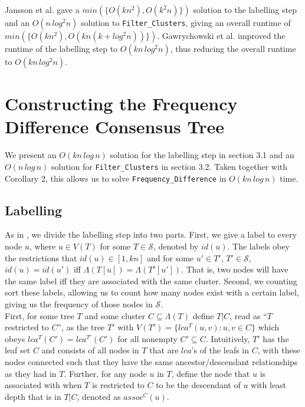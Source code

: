 \documentclass{article}
\newcommand{\leafset}{\Lambda}
\begin{document}
    Jansson et al. \cite{jansson2018algorithms} gave a $min(\{O(kn^2), O(k^2n)\})$ solution to the labelling step and an $O(n\,log^2n)$ solution to \texttt{Filter\_Clusters}, giving an overall runtime of $min(\{O(kn^2), O(kn(k + log^2n))\})$. Gawrychowski et al. \cite{gawrychowski2017faster} improved the runtime of the labelling step to $O(kn\,log^2n)$, thus reducing the overall runtime to $O(kn\,log^2n)$.\\

    \section{Constructing the Frequency Difference Consensus Tree}
    We present an $O(kn\,log\,n)$ solution for the labelling step in section 3.1 and an $O(n\,log\,n)$ solution for \texttt{Filter\_Clusters} in section 3.2. Taken together with Corollary 2, this allows us to solve \texttt{Frequency\_Difference} in $O(kn\,log\,n)$ time.

    \subsection{Labelling}
    As in \cite{gawrychowski2017faster}, we divide the labelling step into two parts. First, we give a label to every node $u$, where $u \in V(T)$ for some $T \in \mathcal{S}$, denoted by $id(u)$. The labels obey the restrictions that $id(u) \in [1, kn]$ and for some $u' \in T'$, $T' \in \mathcal{S}$, $id(u) = id(u')$ iff $\leafset(T[u]) = \leafset(T'[u'])$. That is, two nodes will have the same label iff they are associated with the same cluster. Second, we counting sort these labels, allowing us to count how many nodes exist with a certain label, giving us the frequency of those nodes in $\mathcal{S}$.\\

    First, for some tree $T$ and some cluster $C \subseteq \leafset(T)$ define $T|C$, read as ``$T$ restricted to $C$'', as the tree $T'$ with $V(T') = \{lca^T(u, v) : u, v \in C\}$ which obeys $lca^T(C') = lca^{T'}(C')$ for all nonempty $C' \subseteq C$. Intuitively, $T'$ has the leaf set $C$ and consists of all nodes in $T$ that are $lca$'s of the leafs in $C$, with these nodes connected such that they have the same ancestor/descendant relationships as they had in $T$. Further, for any node $u$ in $T$, define the node that $u$ is associated with when $T$ is restricted to $C$ to be the descendant of $u$ with least depth that is in $T|C$, denoted as $assoc^{C}(u)$.\\
\end{document}
